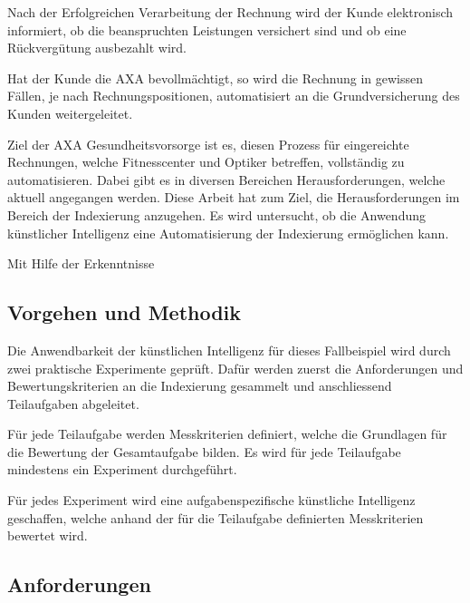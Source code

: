Nach der Erfolgreichen Verarbeitung der Rechnung wird der Kunde elektronisch informiert, ob die beanspruchten Leistungen versichert sind und ob eine Rückvergütung ausbezahlt wird.

Hat der Kunde die AXA bevollmächtigt, so wird die Rechnung in gewissen Fällen, je nach Rechnungspositionen, automatisiert an die Grundversicherung des Kunden weitergeleitet. 

Ziel der AXA Gesundheitsvorsorge ist es, diesen Prozess für eingereichte Rechnungen, welche Fitnesscenter und Optiker betreffen, vollständig zu automatisieren. Dabei gibt es in diversen Bereichen Herausforderungen, welche aktuell angegangen werden. Diese Arbeit hat zum Ziel, die Herausforderungen im Bereich der Indexierung anzugehen. Es wird untersucht, ob die Anwendung künstlicher Intelligenz eine Automatisierung der Indexierung ermöglichen kann.

Mit Hilfe der Erkenntnisse 




\subsection{Vorgehen und Methodik}


Die Anwendbarkeit der künstlichen Intelligenz für dieses Fallbeispiel wird durch zwei praktische Experimente geprüft. Dafür werden zuerst die Anforderungen und Bewertungskriterien an die Indexierung gesammelt und anschliessend Teilaufgaben abgeleitet. 

Für jede Teilaufgabe werden Messkriterien definiert, welche die Grundlagen für die Bewertung der Gesamtaufgabe bilden. Es wird für jede Teilaufgabe mindestens ein Experiment durchgeführt.

Für jedes Experiment wird eine aufgabenspezifische künstliche Intelligenz geschaffen, welche anhand der für die Teilaufgabe definierten Messkriterien bewertet wird.

\subsection{Anforderungen}

